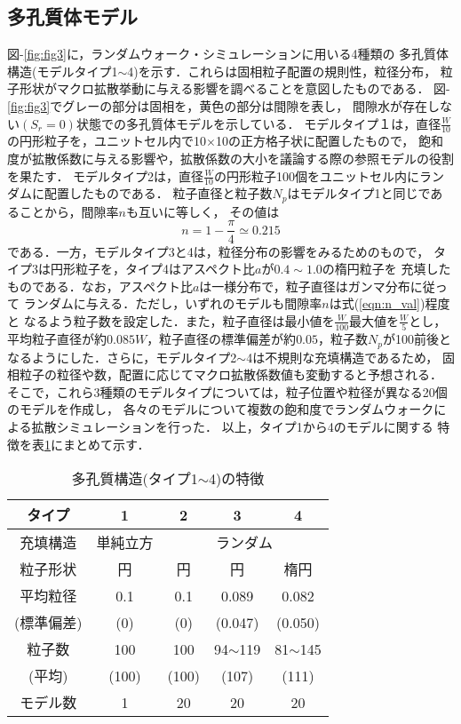 \subsection{多孔質体モデル}
図-\ref{fig:fig3}に，ランダムウォーク・シミュレーションに用いる4種類の
多孔質体構造(モデルタイプ1$\sim$4)を示す．これらは固相粒子配置の規則性，粒径分布，
粒子形状がマクロ拡散挙動に与える影響を調べることを意図したものである．
図-\ref{fig:fig3}でグレーの部分は固相を，黄色の部分は間隙を表し，
間隙水が存在しない$(S_r=0)$状態での多孔質体モデルを示している． 
モデルタイプ１は，直径$\frac{W}{10}$の円形粒子を，ユニットセル内で10$\times$10の正方格子状に配置したもので，
飽和度が拡散係数に与える影響や，拡散係数の大小を議論する際の参照モデルの役割を果たす．
モデルタイプ2は，直径$\frac{W}{10}$の円形粒子100個をユニットセル内にランダムに配置したものである．
粒子直径と粒子数$N_p$はモデルタイプ1と同じであることから，間隙率$n$も互いに等しく，
その値は
\begin{equation}
	n=1-\frac{\pi}{4}\simeq 0.215
	\label{eqn:n_val}
\end{equation}
である．一方，モデルタイプ3と4は，粒径分布の影響をみるためのもので，
タイプ3は円形粒子を，タイプ4はアスペクト比$a$が$0.4\sim 1.0$の楕円粒子を
充填したものである．なお，アスペクト比$a$は一様分布で，粒子直径はガンマ分布に従って
ランダムに与える．ただし，いずれのモデルも間隙率$n$は式(\ref{eqn:n_val})程度と
なるよう粒子数を設定した．また，粒子直径は最小値を$\frac{W}{100}$最大値を$\frac{W}{5}$とし，
平均粒子直径が約$0.085W$，粒子直径の標準偏差が約$0.05$，粒子数$N_p$が100前後と
なるようにした．さらに，モデルタイプ2$\sim$4は不規則な充填構造であるため，
固相粒子の粒径や数，配置に応じてマクロ拡散係数値も変動すると予想される．
そこで，これら3種類のモデルタイプについては，粒子位置や粒径が異なる20個のモデルを作成し，
各々のモデルについて複数の飽和度でランダムウォークによる拡散シミュレーションを行った．
以上，タイプ1から4のモデルに関する
特徴を表\ref{tbl:types}にまとめて示す．
\begin{table}[htb]
  \caption{多孔質構造(タイプ1$\sim$4)の特徴}
  \begin{tabular}{c|c|c|c|c}
\hline
    タイプ & 1 & 2 & 3 & 4 \\
	\hline\hline
	  充填構造& 単純立方& \multicolumn{3}{c}{ランダム} 
	  \\
    \hline
粒子形状 & 円 &円 & 円 & 楕円\\
	\hline
   平均粒径 & 0.1 & 0.1 & 0.089 & 0.082\\ 
 (標準偏差) & (0) & (0) & (0.047) & (0.050) \\
\hline
粒子数 & 100 & 100 & 94$\sim$119 & 81$\sim$145 \\
(平均) & (100) & (100) & (107) & (111) \\
\hline
モデル数& 1 &20 &20 & 20 \\
\hline
  \end{tabular}
\label{tbl:types}
\end{table}
